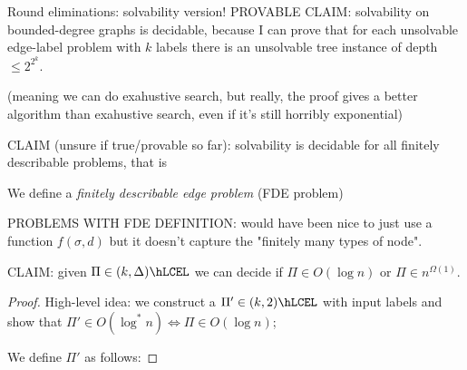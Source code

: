 \documentclass[12pt,a4paper]{article}
\begin{document}
Round eliminations: solvability version! 
PROVABLE CLAIM: solvability on bounded-degree graphs is decidable, because I can prove that for each unsolvable edge-label problem with $k$ labels there is an unsolvable tree instance of depth $\leq 2^{2^k}$.

(meaning we can do exahustive search, but really, the proof gives a better algorithm than exahustive search, even if it's still horribly exponential)

CLAIM (unsure if true/provable so far): solvability is decidable for all finitely describable problems, that is
\begin{defn}
    We define a \emph{finitely describable edge problem} (FDE problem) 
\end{defn}
PROBLEMS WITH FDE DEFINITION: would have been nice to just use a function $f(\sigma,d)$ but it doesn't capture the "finitely many types of node". 




CLAIM: given $\Pi\in(k,\Delta)\hLCEL$ we can decide if $\Pi\in O(\log n)$ or $\Pi\in n^{\Omega(1)}$.
\begin{proof}
    High-level idea: we construct a $\Pi'\in(k,2)\hLCEL$ with input labels and show that $\Pi'\in O(\log^*n)\iff \Pi\in O(\log n)$;%

    We define $\Pi'$ as follows: 
\end{proof}
\end{document}

